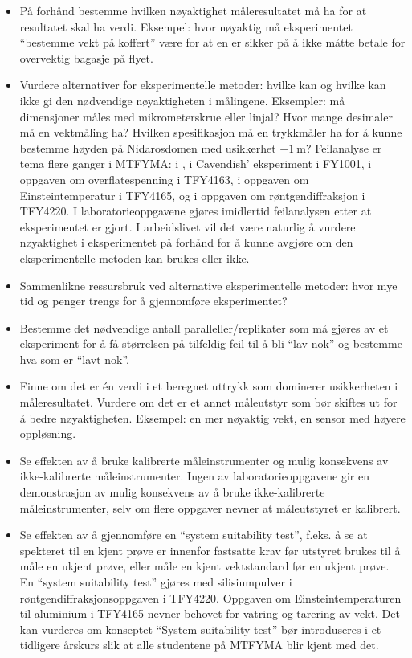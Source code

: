 \documentclass{article}
\begin{document}
\begin{itemize}
\begin{itemize}
  \item På forhånd bestemme hvilken nøyaktighet måleresultatet må ha for at resultatet skal ha verdi. Eksempel: hvor nøyaktig må eksperimentet ``bestemme vekt på koffert'' være for at en er sikker på å ikke måtte betale for overvektig bagasje på flyet.
  \item Vurdere alternativer for eksperimentelle metoder: hvilke kan og hvilke kan ikke gi den nødvendige nøyaktigheten i målingene. Eksempler: må dimensjoner måles med mikrometerskrue eller linjal? Hvor mange desimaler må en vektmåling ha? Hvilken spesifikasjon må en trykkmåler ha for å kunne bestemme høyden på Nidarosdomen med usikkerhet $\pm\SI{1}{\meter}$? Feilanalyse er tema flere ganger i MTFYMA: i \cite{Persson2020}, i Cavendish’ eksperiment i FY1001, i oppgaven om overflatespenning i TFY4163, i oppgaven om Einsteintemperatur i TFY4165, og i oppgaven om røntgendiffraksjon i TFY4220. I laboratorieoppgavene gjøres imidlertid feilanalysen etter at eksperimentet er gjort. I arbeidslivet vil det være naturlig å vurdere nøyaktighet i eksperimentet på forhånd for å kunne avgjøre om den eksperimentelle metoden kan brukes eller ikke.
  \item Sammenlikne ressursbruk ved alternative eksperimentelle metoder: hvor mye tid og penger trengs for å gjennomføre eksperimentet?
  \item Bestemme det nødvendige antall paralleller/replikater som må gjøres av et eksperiment for å få størrelsen på tilfeldig feil til å bli ``lav nok'' og bestemme hva som er ``lavt nok''.
  \item Finne om det er én verdi i et beregnet uttrykk som dominerer usikkerheten i måleresultatet. Vurdere om det er et annet måleutstyr som bør skiftes ut for å bedre nøyaktigheten. Eksempel: en mer nøyaktig vekt, en sensor med høyere oppløsning.
  \item Se effekten av å bruke kalibrerte måleinstrumenter og mulig konsekvens av ikke-kalibrerte måleinstrumenter. Ingen av laboratorieoppgavene gir en demonstrasjon av mulig konsekvens av å bruke ikke-kalibrerte måleinstrumenter, selv om flere oppgaver nevner at måleutstyret er kalibrert.
  \item Se effekten av å gjennomføre en ``system suitability test'', f.eks. å se at spekteret til en kjent prøve er innenfor fastsatte krav før utstyret brukes til å måle en ukjent prøve, eller måle en kjent vektstandard før en ukjent prøve.  En ``system suitability test'' gjøres med silisiumpulver i røntgendiffraksjonsoppgaven i TFY4220. Oppgaven om Einsteintemperaturen til aluminium i TFY4165 nevner behovet for vatring og tarering av vekt. Det kan vurderes om konseptet ``System suitability test'' bør introduseres i et tidligere årskurs slik at alle studentene på MTFYMA blir kjent med det.
\end{itemize}
\end{itemize}
\end{document}
